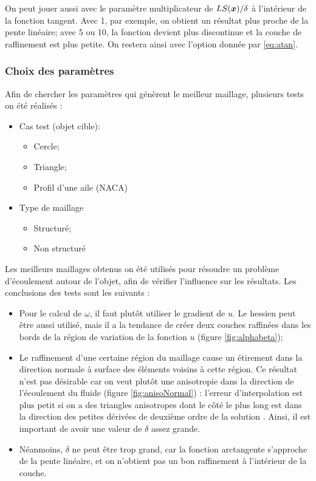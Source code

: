 \indent On peut jouer aussi avec le paramètre multiplicateur de \(LS(\boldsymbol{x})/\delta\) à l'intérieur de la fonction tangent. Avec 1, par exemple, on obtient un résultat plus proche de la pente linéaire; avec 5 ou 10, la fonction devient plus discontinue et la couche de raffinement est plus petite. On restera ainsi avec l'option donnée par \eqref{eq:atan}.



\subsubsection{Choix des paramètres}

\indent Afin de chercher les paramètres qui génèrent le meilleur maillage, plusieurs tests on été réalisés : 

\begin{itemize}
	\item Cas test (objet cible): 
	\begin{itemize}
		\item Cercle;
		\item Triangle;
		\item Profil d'une aile (NACA)
	\end{itemize}
	\item Type de maillage
	\begin{itemize}
		\item Structuré;
		\item Non structuré
	\end{itemize}
\end{itemize}

\indent Les meilleurs maillages obtenus on été utilisés pour résoudre un problème d'écoulement autour de l'objet, afin de vérifier l'influence sur les résultats. Les conclusions des tests sont les suivants : 

\begin{itemize}
  \item Pour le calcul de \(\omega\), il faut plutôt utiliser le gradient de \(u\). Le hessien peut être aussi utilisé, mais il a la tendance de créer deux couches raffinées dans les bords de la région de variation de la fonction \(u\) (figure \ref{fig:alphabeta});
  \item Le raffinement d'une certaine région du maillage cause un étirement dans la direction normale à surface des éléments voisins à cette région. Ce résultat n'est pas désirable car on veut plutôt une anisotropie dans la direction de l'écoulement du fluide (figure \ref{fig:anisoNormal}) : l'erreur d'interpolation est plus petit si on a des triangles anisotropes dont le côté le plus long est dans la direction des petites dérivées de deuxième ordre de la solution \cite{rippa}. Ainsi, il est important de avoir une valeur de \(\delta\) assez grande.
  \item Néanmoins, \(\delta\) ne peut être trop grand, car la fonction arctangente s'approche de la pente linéaire, et on n'obtient pas un bon raffinement à l'intérieur de la couche.
\end{itemize}


